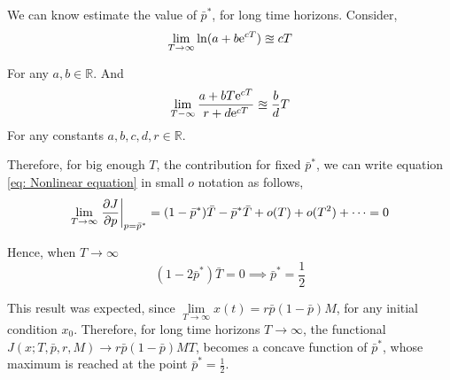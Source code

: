 We can know estimate the value of $\bar{p}^*$, for long time horizons. Consider,  
\begin{equation}	
\lim\limits_{T\rightarrow \infty} \ln(a+b\mathrm{e}^{cT})\approxeq cT
\end{equation}

For any $a,b \in \mathbb{R}$. And
\begin{equation}
	\lim\limits_{T-\infty}\frac{a+bT\mathrm{e}^{cT}}{r+d\mathrm{e}^{cT}} \approxeq \frac{b}{d}T
\end{equation}
For any constants $a,b,c,d,r \in \mathbb{R}$. 

Therefore, for big enough $T$, the contribution for fixed $\bar{p}^*$, we can write equation \ref{eq: Nonlinear equation} in small $o$ notation as follows,
\begin{equation}
\lim\limits_{T\rightarrow \infty}\left.\frac{\partial J}{{\partial p}}\right|_{p=\bar{p}^*} =(1-\bar{p}^*)\bar{T}-\bar{p}^*\bar{T}+o(T)+o(T^2)+\dots=0 
\end{equation}

Hence, when $T\rightarrow \infty$
\begin{equation}
	(1-2\bar{p}^*)\bar{T}=0\implies \bar{p}^*=\frac{1}{2}
\end{equation}

This result was expected, since 
$\lim\limits_{T\rightarrow\infty} x(t) = r\bar{p}(1-\bar{p})M$, for any initial condition $x_0$. Therefore, for long time horizons $T\rightarrow \infty$, the functional $J(x; T,\bar{p},r,M)\rightarrow r\bar{p}(1-\bar{p})MT$, becomes a concave function of $\bar{p}^*$, whose maximum is reached at the point $\bar{p}^*=\frac{1}{2}$.